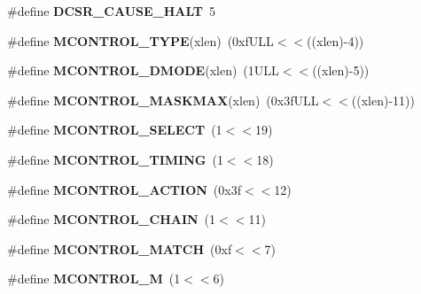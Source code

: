 \begin{DoxyCompactItemize}
\item 
\mbox{\label{riscv-utility_8h_abbe672c98c7614d6346e83e80ee0df18}} 
\#define {\bfseries D\+C\+S\+R\+\_\+\+C\+A\+U\+S\+E\+\_\+\+H\+A\+LT}~5
\item 
\mbox{\label{riscv-utility_8h_a4be6cc72618e21a3011b626aff83eae8}} 
\#define {\bfseries M\+C\+O\+N\+T\+R\+O\+L\+\_\+\+T\+Y\+PE}(xlen)~(0xf\+U\+L\+L$<$$<$((xlen)-\/4))
\item 
\mbox{\label{riscv-utility_8h_ab0c4b6681fe0b3fba6d512a084e318b2}} 
\#define {\bfseries M\+C\+O\+N\+T\+R\+O\+L\+\_\+\+D\+M\+O\+DE}(xlen)~(1\+U\+L\+L$<$$<$((xlen)-\/5))
\item 
\mbox{\label{riscv-utility_8h_a9d2d58a19b42feb156d060c4860773e3}} 
\#define {\bfseries M\+C\+O\+N\+T\+R\+O\+L\+\_\+\+M\+A\+S\+K\+M\+AX}(xlen)~(0x3f\+U\+L\+L$<$$<$((xlen)-\/11))
\item 
\mbox{\label{riscv-utility_8h_ae3271344364caa6fdeedf62cad06ec32}} 
\#define {\bfseries M\+C\+O\+N\+T\+R\+O\+L\+\_\+\+S\+E\+L\+E\+CT}~(1$<$$<$19)
\item 
\mbox{\label{riscv-utility_8h_a05f32197da7d4f4da6cd9ffd706f0181}} 
\#define {\bfseries M\+C\+O\+N\+T\+R\+O\+L\+\_\+\+T\+I\+M\+I\+NG}~(1$<$$<$18)
\item 
\mbox{\label{riscv-utility_8h_aa00ebcbad8ef4fd0b082ae955c70159a}} 
\#define {\bfseries M\+C\+O\+N\+T\+R\+O\+L\+\_\+\+A\+C\+T\+I\+ON}~(0x3f$<$$<$12)
\item 
\mbox{\label{riscv-utility_8h_a1ab44c2e81a1a31e766ec682cad96ea9}} 
\#define {\bfseries M\+C\+O\+N\+T\+R\+O\+L\+\_\+\+C\+H\+A\+IN}~(1$<$$<$11)
\item 
\mbox{\label{riscv-utility_8h_a29db79af22f38eb123f1bf1c11c4c92a}} 
\#define {\bfseries M\+C\+O\+N\+T\+R\+O\+L\+\_\+\+M\+A\+T\+CH}~(0xf$<$$<$7)
\item 
\mbox{\label{riscv-utility_8h_a0b9146969080ec187962cbe3ee3f5aba}} 
\#define {\bfseries M\+C\+O\+N\+T\+R\+O\+L\+\_\+M}~(1$<$$<$6)
$$
\end{DoxyCompactItemize}
